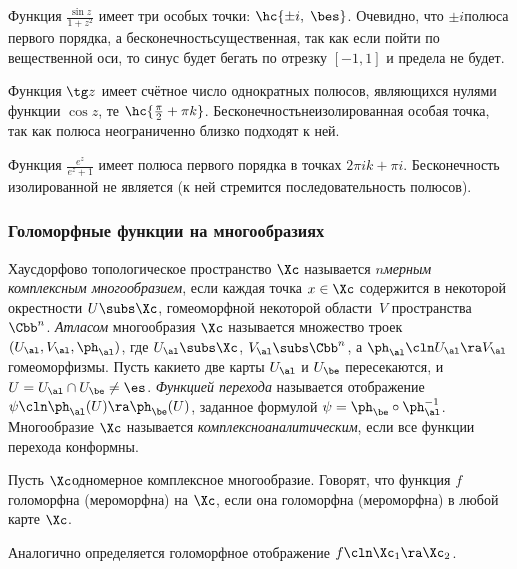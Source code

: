 \documentclass[a4paper]{article}
\begin{document}
\begin{ex}
Функция $\frac{\sin z}{1+z^2}$ имеет три особых точки: $\hc{\pm i, \; \bes}$. Очевидно, что $\pm i$\т полюса
первого порядка, а бесконечность\т существенная, так как если пойти по вещественной оси,
то синус будет бегать по отрезку $[-1, 1]$ и предела не будет.
\end{ex}

\begin{ex}
Функция $\tg z$ имеет счётное число однократных полюсов, являющихся нулями
функции $\cos z$, те $\hc{\frac{\pi}{2} + \pi k}$. Бесконечность\т неизолированная особая точка, так как полюса
неограниченно близко подходят к ней.
\end{ex}

\begin{ex}
Функция $\frac{e^z}{e^z + 1}$ имеет полюса первого порядка в точках $2\pi i k + \pi i$. Бесконечность
изолированной не является (к ней стремится последовательность полюсов).
\end{ex}


\subsubsection{Голоморфные функции на многообразиях}

\begin{df}
Хаусдорфово топологическое пространство $\Xc$ называется \emph{$n$\д мерным комплексным многообразием},
если каждая точка $x \in \Xc$ содержится в некоторой окрестности $U \subs \Xc$, гомеоморфной некоторой
области~$V$ пространства $\Cbb^n$. \emph{Атласом} многообразия $\Xc$ называется множество троек
$(U_\al, V_\al, \ph_\al)$, где $U_\al \subs \Xc$, $V_\al\subs \Cbb^n$, а $\ph_\al\cln U_\al \ra V_\al$\т гомеоморфизмы.
Пусть какие\д то две карты $U_\al$ и $U_\be$ пересекаются, и $U = U_\al \cap U_\be \neq \es$. \emph{Функцией перехода}
называется отображение $\psi\cln \ph_\al(U) \ra \ph_\be(U)$, заданное формулой $\psi = \ph_\be\circ \ph_\al^{-1}$.
Многообразие $\Xc$ называется \emph{комплексно\д аналитическим}, если все функции перехода конформны.
\end{df}

\begin{df}
Пусть $\Xc$\т одномерное комплексное многообразие. Говорят, что функция $f$ голоморфна (мероморфна) на $\Xc$,
если она голоморфна (мероморфна) в любой карте $\Xc$.
\end{df}

Аналогично определяется голоморфное отображение $f\cln\Xc_1 \ra \Xc_2$.
\end{document}
